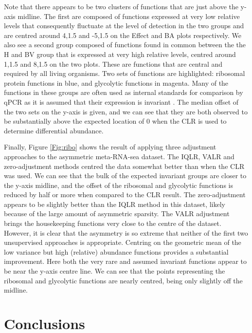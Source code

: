 \documentclass{bmcart}
\begin{document}
Note that there appears to be two clusters of functions that are just above the y-axis midline. The first are composed of functions expressed at very low relative levels that consequently fluctuate at the level of detection in the two groups and are centred around 4,1.5 and -5,1.5 on the Effect and BA plots respectively.  We also see a second group composed of functions found in common between the the H and BV group that is  expressed at very high relative levels, centred around 1,1.5 and 8,1.5 on the two plots. These are functions that are central and required by all living organisms. Two sets of functions are highlighted: ribosomal protein functions in blue, and glycolytic functions in magenta. Many of the functions in these groups are often used as internal standards for comparison by qPCR as it is assumed that their expression is invariant \cite{Scott:2010}. The median offset of the two sets on the y-axis is given, and we can see that they are both observed to be substantially above the expected location of 0 when the CLR is used to determine differential abundance.   


Finally, Figure \ref{Fig:ribo} shows the result of applying  three adjustment approaches to the asymmetric meta-RNA-sea dataset. The IQLR, VALR and zero-adjustment methods centred the data somewhat better than when the CLR was used. We can see that the bulk of the expected invariant groups are closer to the y-axis midline, and the offset of the ribosomal and glycolytic functions is reduced by half or more when compared to the CLR result. The zero-adjustment  appears to be slightly better than the IQLR method in this dataset, likely because of the large amount of asymmetric sparsity. The VALR adjustment brings the housekeeping functions very close to the centre of the dataset. However, it is clear that the asymmetry is so extreme that neither of the first two unsupervised approaches is appropriate. Centring on the geometric mean of the low variance but high (relative) abundance functions provides a substantial improvement. Here both the very rare and assumed invariant functions appear to be near the y-axis centre line. We can see that the points representing the ribosomal and glycolytic functions are nearly centred, being only slightly off the midline.

\section*{Conclusions}
\end{document}
